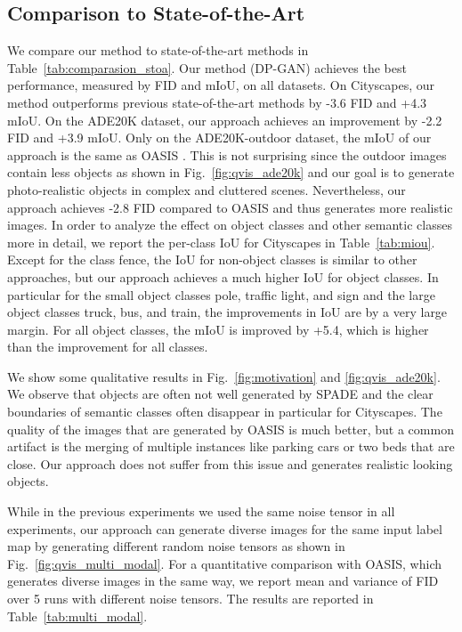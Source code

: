 \documentclass{bmvc2k}
\newcommand{\figref}[1]{Fig.~\ref{#1}}
\newcommand{\tabref}[1]{Table~\ref{#1}}
\begin{document}
\subsection{Comparison to State-of-the-Art}
We compare our method to state-of-the-art methods in \tabref{tab:comparasion_stoa}. Our method (DP-GAN) achieves the best performance, measured by FID and mIoU, on all datasets. On Cityscapes, our method outperforms previous state-of-the-art methods by -3.6 FID and +4.3 mIoU. On the ADE20K dataset, our approach achieves an improvement by -2.2 FID and +3.9 mIoU. Only on the ADE20K-outdoor dataset, the mIoU of our approach is the same as OASIS \cite{schonfeld_sushko_iclr2021}. This is not surprising since the outdoor images contain less objects as shown in \figref{fig:qvis_ade20k} and our goal is to generate photo-realistic objects in complex and cluttered scenes. Nevertheless, our approach achieves -2.8 FID compared to OASIS and thus generates more realistic images. In order to analyze the effect on object classes and other semantic classes more in detail, we report the per-class IoU for Cityscapes in \tabref{tab:miou}. Except for the class fence, the IoU for non-object classes is similar to other approaches, but our approach achieves a much higher IoU for object classes. In particular for the small object classes pole, traffic light, and sign and the large object classes truck, bus, and train, the improvements in IoU are by a very large margin. For all object classes, the mIoU is improved by +5.4, which is higher than the improvement for all classes. 












We show some qualitative results in \figref{fig:motivation} and \ref{fig:qvis_ade20k}. We observe that objects are often not well generated by SPADE and the clear boundaries of semantic classes often disappear in particular for Cityscapes. The quality of the images that are generated by OASIS is much better, but a common artifact is the merging of multiple instances like parking cars or two beds that are close. Our approach does not suffer from this issue and generates realistic looking objects. 

While in the previous experiments we used the same noise tensor  in all experiments, our approach can generate diverse images for the same input label map by generating different random noise tensors  as shown in \figref{fig:qvis_multi_modal}. For a quantitative comparison with OASIS, which generates diverse images in the same way, we report mean and variance of FID over 5 runs with different noise tensors. The results are reported in \tabref{tab:multi_modal}. 
\end{document}
